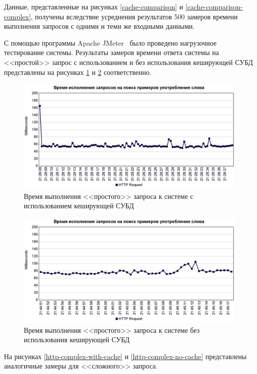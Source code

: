 Данные, представленные на рисунках \ref{cache-comparison} и \ref{cache-comparison-complex}, получены вследствие усреднения результатов 500 замеров времени выполнения запросов с одними и теми же входными данными.

С помощью программы Apache JMeter~\cite{jmeter} было проведено нагрузочное тестирование системы. 
Результаты замеров времени ответа системы на <<простой>> запрос с использованием и без использования кеширующей СУБД представлены на рисунках \ref{http-with-cache} и \ref{http-no-cache} соответственно.

\begin{figure}[H]
	\centering
	\includegraphics[width=\textwidth]{img/plots/http-with-cache}
	\caption{Время выполнения <<простого>> запроса к системе с использованием кеширующей СУБД}
	\label{http-with-cache}
\end{figure}

\begin{figure}[ht]
	\centering
	\includegraphics[width=\textwidth]{img/plots/http-no-cache}
	\caption{Время выполнения <<простого>> запроса к системе без использования кеширующей СУБД}
	\label{http-no-cache}
\end{figure}\clearpage

На рисунках \ref{http-complex-with-cache} и \ref{http-complex-no-cache} представлены аналогичные замеры для <<сложного>> запроса.

